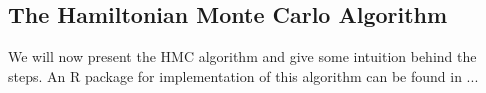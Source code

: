 \documentclass[11pt]{article}
\begin{document}


\pagebreak
\subsection{The Hamiltonian Monte Carlo Algorithm}
We will now present the HMC algorithm and give some intuition behind the steps. An R package for implementation of this algorithm can be found in ... 
\end{document}
